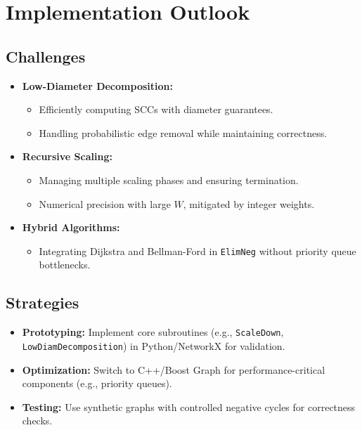 \documentclass{article}
\begin{document}
\section{Implementation Outlook}

\subsection{Challenges}
\begin{itemize}
    \item \textbf{Low-Diameter Decomposition:}
        \begin{itemize}
            \item Efficiently computing SCCs with diameter guarantees.
            \item Handling probabilistic edge removal while maintaining correctness.
        \end{itemize}
    \item \textbf{Recursive Scaling:}
        \begin{itemize}
            \item Managing multiple scaling phases and ensuring termination.
            \item Numerical precision with large \( W \), mitigated by integer weights.
        \end{itemize}
    \item \textbf{Hybrid Algorithms:}
        \begin{itemize}
            \item Integrating Dijkstra and Bellman-Ford in \texttt{ElimNeg} without priority queue bottlenecks.
        \end{itemize}
\end{itemize}

\subsection{Strategies}
\begin{itemize}
    \item \textbf{Prototyping:} Implement core subroutines (e.g., \texttt{ScaleDown}, \texttt{LowDiamDecomposition}) in Python/NetworkX for validation.
    \item \textbf{Optimization:} Switch to C++/Boost Graph for performance-critical components (e.g., priority queues).
    \item \textbf{Testing:} Use synthetic graphs with controlled negative cycles for correctness checks.
\end{itemize}
\end{document}
